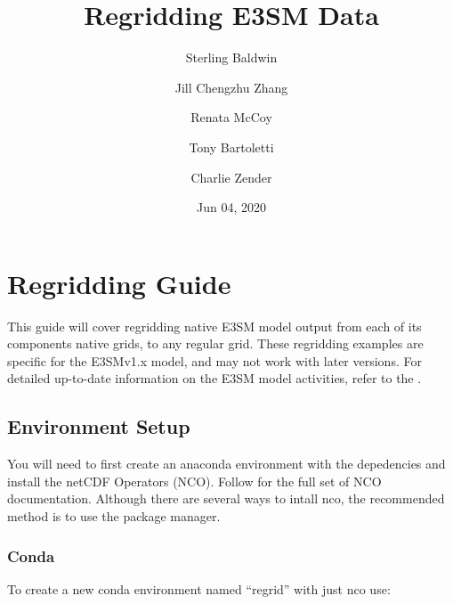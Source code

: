 \documentclass[letterpaper,10pt,english]{sphinxmanual}
\title{Regridding E3SM Data}
\date{Jun 04, 2020}
\author{Sterling Baldwin \and Jill Chengzhu Zhang \and Renata McCoy \and Tony Bartoletti \and Charlie Zender}
\begin{document}
\pagestyle{empty}
\sphinxmaketitle
\pagestyle{plain}
\sphinxtableofcontents
\pagestyle{normal}
\label{\detokenize{index::doc}}



\chapter{Regridding Guide}
\label{\detokenize{guide:regridding-guide}}\label{\detokenize{guide:guide}}\label{\detokenize{guide::doc}}
This guide will cover regridding native E3SM model output from each of its components native grids, to
any regular grid. These regridding examples are specific for the E3SMv1.x model, and may not work with later versions. For detailed up-to-date information on the
E3SM model activities, refer to the .


\section{Environment Setup}
\label{\detokenize{guide:environment-setup}}
You will need to first create an anaconda environment with the depedencies and install the netCDF Operators (NCO).
Follow  for the full set of NCO documentation.
Although there are several ways to intall nco, the recommended method is to use the  package manager.


\subsection{Conda}
\label{\detokenize{guide:id1}}
\begin{sphinxVerbatim}[commandchars=\\\{\}]
    
\end{sphinxVerbatim}

To create a new conda environment named “regrid” with just nco use:

\begin{sphinxVerbatim}[commandchars=\\\{\}]
      
\end{sphinxVerbatim}
\end{document}

